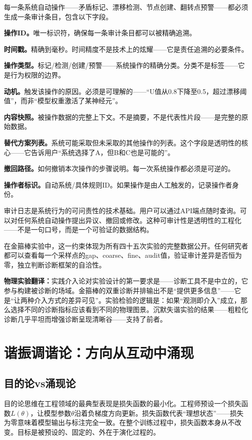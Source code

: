 \documentclass[11pt,a4paper]{book}
\theoremstyle{definition}
\begin{document}
每一条系统自动操作——矛盾标记、漂移检测、节点创建、翻转点预警——都必须生成一条审计条目，包含以下字段。

\textbf{操作ID。}唯一标识符，确保每一条审计条目都可以被精确追溯。

\textbf{时间戳。}精确到毫秒。时间精度不是技术上的炫耀——它是责任追溯的必要条件。

\textbf{操作类型。}标记/检测/创建/预警——系统操作的精确分类。分类不是标签——它是行为权限的边界。

\textbf{动机。}触发该操作的原因。必须是可理解的——“U值从0.8下降至0.5，超过漂移阈值”，而非“模型权重激活了某神经元”。

\textbf{内容快照。}被操作数据的完整上下文。不是摘要，不是代表性片段——是完整的原始数据。

\textbf{替代方案列表。}系统可能采取但未采取的其他操作的列表。这个字段是透明性的核心——它告诉用户“系统选择了A，但B和C也是可能的”。

\textbf{撤回路径。}如何撤销本次操作的步骤说明。每一次系统操作都必须是可逆的。

\textbf{操作者标识。}自动系统/具体规则ID。如果操作是由人工触发的，记录操作者身份。

审计日志是系统行为的可问责性的技术基础。用户可以通过API端点随时查询。可以对任何系统自动操作提出异议、撤回或修改。这种可审计性是透明性的工程化——不是一句口号，而是一个可验证的数据结构。

在金箍棒实验中，这一约束体现为所有四十五次实验的完整数据公开。任何研究者都可以查看每一个采样点的gap、coarse、fine、audit值，验证审计差异是否恒为零，独立判断诊断框架的自洽性。

\textbf{物理实验翻译：}实践介入论对实验设计的第一要求是——诊断工具不是中立的，它参与构建被诊断的场域。金箍棒的双重诊断并排输出不是“提供更多信息”——它是“让两种介入方式的差异可见”。实验检验的逻辑是：如果“观测即介入”成立，那么选择不同的诊断指标应该看到不同的物理图景。沉默失谐实验的结果——粗粒化诊断几乎平坦而增强诊断呈现清晰谷——支持了前者。

\section{谐振调谐论：方向从互动中涌现}

\subsection{目的论vs涌现论}

目的论思维在工程领域的最典型表现是损失函数的最小化。工程师预设一个损失函数$L(\theta)$，让模型参数$\theta$沿着负梯度方向更新。损失函数代表“理想状态”——损失为零意味着模型输出与标注完全一致。在整个训练过程中，损失函数本身从不改变。目标是被预设的、固定的、外在于演化过程的。
\end{document}
